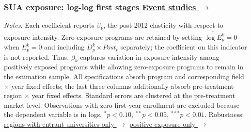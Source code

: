 \documentclass{beamer}
\begin{document}
\begin{frame}[label=sua-log-first-stage]

\frametitle{
SUA exposure: log-log first stages
\hfill
\hyperlink{sua-log-event-studies}{
\scriptsize\color{blue}
Event studies $\rightarrow$
}
}

\centering
\scriptsize


\begin{center}
\end{center}

\vspace{0.06cm}


\resizebox{0.58\textwidth}{!}{

}

\vspace{0.10cm}


\parbox{0.94\textwidth}{
\tiny
\textit{Notes:}
Each coefficient reports $\beta_k$, the post-2012 elasticity with respect
to exposure intensity. Zero-exposure programs are retained by setting
$\widetilde{\log E_p^k}=0$ when $E_p^k=0$ and including
$D_p^k\times Post_t$ separately; the coefficient on this indicator is not
reported. Thus, $\beta_k$ captures variation in exposure intensity among
positively exposed programs while allowing zero-exposure programs to remain
in the estimation sample. All specifications absorb program and corresponding
field $\times$ year fixed effects; the last three columns additionally absorb
pre-treatment region $\times$ year fixed effects. Standard errors are clustered
at the pre-treatment market level. Observations with zero first-year enrollment
are excluded because the dependent variable is in logs.
$^{*}p<0.10$, $^{**}p<0.05$, $^{***}p<0.01$.
Robustness: \hyperlink{sua-fs-log-entrant}{\color{blue}regions with entrant
universities only $\rightarrow$} \quad
\hyperlink{sua-fs-log-positive}{\color{blue}positive exposure only $\rightarrow$}
}

\end{frame}
\end{document}
